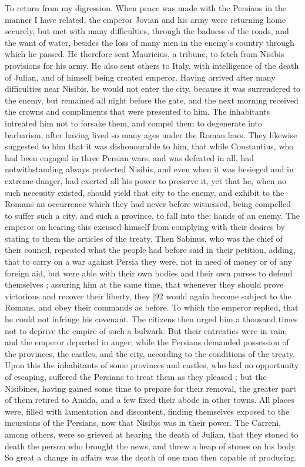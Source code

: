 To return from my digression. When peace was made with the Persians in the manner I have related, the emperor Jovian and his army were returning home securely, but met with many difficulties, through the badness of the roads, and the want of water, besides the loss of many men in the enemy's country through which he passed. He therefore sent Mauricius, a tribune, to fetch from Nisibis provisions for his army. He also sent others to Italy, with intelligence of the death of Julian, and of himself being created emperor. Having arrived after many difficulties near Nisibis, he would not enter the city, because it was surrendered to the enemy, but remained all night before the gate, and the next morning received the crowns and compliments that were presented to him. The inhabitants intreated him not to forsake them, and compel them to degenerate into barbarism, after having lived so many ages under the Roman laws. They
likewise suggested to him that it was dishonourable to him, that while Constantius, who had been engaged in three Persian wars, and was defeated in all, had notwithstanding always protected Nisibis, and even when it was besieged and in extreme danger, had exerted all his power to preserve it, yet that he, when no such necessity existed, should yield that city to the enemy, and exhibit to the Romans an occurrence which they had never before witnessed, being compelled to suffer such a city, and such a province, to fall into the: hands of an enemy. The emperor on hearing this excused himself from complying with their desires by stating to them the articles of the treaty. Then Sabinus, who was the chief of their council, repeated what the people had before said in their petition, adding, that to carry on a war against Persia they were, not in need of money or of any foreign aid, but were able with their own bodies and their own purses to defend themselves ; assuring him at the same time, that whenever they should prove victorious and recover their liberty, they
|92 would again become subject to the Romans, and obey their commands as before. To which the emperor replied, that he could not infringe his covenant. The citizens then urged him a thousand times not to deprive the empire of such a bulwark. But their entreaties were in vain, and the emperor departed in anger; while the Persians demanded possession of the provinces, the castles, and the city, according to the conditions of the treaty. Upon this the inhabitants of some provinces and castles, who had no opportunity of escaping, suffered the Persians to treat them as they pleased ; but the Nisibines, having gained some time to prepare for their removal, the greater part of them retired to Amida, and a few fixed their abode in other towns. All places were, filled with lamentation and discontent, finding themselves exposed to the incursions of the Persians, now that Nisibis was in their power. The Carreni, among others, were so grieved at hearing the death of Julian, that they stoned to death the person who brought the news, and threw a heap of stones on his body. So great a change in affairs was the death of one man then capable of producing.

